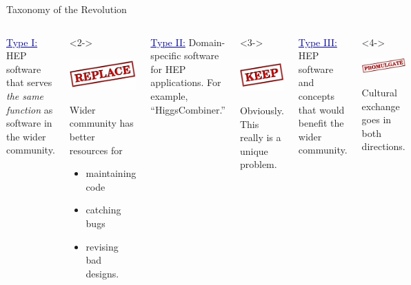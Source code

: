 \documentclass[aspectratio=169]{beamer}
\begin{document}
\begin{frame}{Taxonomy of the Revolution}
\vspace{0.25 cm}
\begin{columns}[t]
\textcolor{darkblue}{\underline{Type I:}} HEP software that serves {\it the same function} as software in the wider community.

\begin{uncoverenv}<2->
\begin{center}
\includegraphics[height=1.5 cm]{stamp_replace.png}
\end{center}

Wider community has better resources for
\begin{itemize}
\item maintaining code
\item catching bugs
\item revising bad designs.
\end{itemize}
\end{uncoverenv}

\textcolor{darkblue}{\underline{Type II:}} Domain-specific software for HEP applications. For example, ``HiggsCombiner.''

\begin{uncoverenv}<3->
\begin{center}
\includegraphics[height=1.5 cm]{stamp_keep.png}
\end{center}

Obviously. This really is a unique problem.
\end{uncoverenv}

\textcolor{darkblue}{\underline{Type III:}} HEP software and concepts that would benefit the wider community. \\ \mbox{ }

\begin{uncoverenv}<4->
\begin{center}
\includegraphics[height=1.5 cm]{stamp_promulgate.png}
\end{center}

Cultural exchange goes in both directions.
\end{uncoverenv}
\end{columns}
\end{frame}
\end{document}
